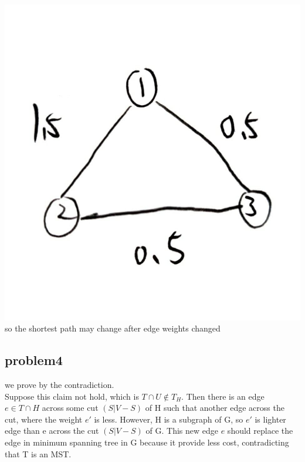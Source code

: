 \documentclass[11pt]{article}
\begin{document}
\includegraphics[scale=0.2]{ng1}\\
so the shortest path may change after edge weights changed\\
\subsection{problem4}
we prove by the contradiction.\\
Suppose this claim not hold, which is $T\cap U \notin T_H$. Then there is an edge $e\in T \cap H$ across some cut $(S|V-S)$ of H such that another edge across the cut, where the weight $e'$ is less. However, H is a subgraph of G, so $e'$ is lighter edge than e across the cut $(S|V-S)$ of G. This new edge $e$ should replace the edge in minimum spanning tree in G because it provide less cost, contradicting that T is an MST.
\end{document}
